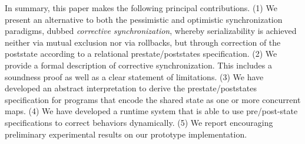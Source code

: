 In summary, this paper makes the following principal contributions.
  (1) We present an alternative to both the pessimistic and optimistic synchronization paradigms, dubbed \emph{corrective synchronization}, whereby serializability is achieved neither via mutual exclusion nor via rollbacks, but through correction of the poststate according to a relational prestate/poststates specification.
(2) We provide a formal description of corrective synchronization. This includes a soundness proof as well as a clear statement of limitations.
	(3) We have developed an abstract interpretation to derive the prestate/poststates specification for programs that encode the shared state as one or more concurrent maps. 
(4) We have developed a runtime system that is able to use
pre/post-state specifications to correct behaviors dynamically.
%
(5) We report encouraging preliminary experimental results on
our prototype implementation.

